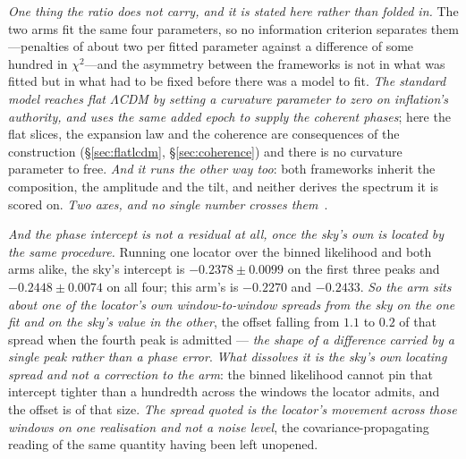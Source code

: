 \documentclass[11pt,a4paper]{article}
\theoremstyle{plain}
\theoremstyle{definition}
\theoremstyle{remark}
\begin{document}
\emph{One thing the ratio does not carry, and it is stated here rather than folded in.} The two arms fit the
same four parameters, so no information criterion separates them---penalties of about two per fitted parameter
against a difference of some hundred in $\chi^{2}$---and the asymmetry between the frameworks is not in what was
fitted but in what had to be fixed before there was a model to fit. \emph{The standard model reaches flat
$\Lambda$CDM by setting a curvature parameter to zero on inflation's authority, and uses the same added epoch
to supply the coherent phases}; here the flat slices, the expansion law and the coherence are consequences of
the construction (\S\ref{sec:flatlcdm}, \S\ref{sec:coherence}) and there is no curvature parameter to free.
\emph{And it runs the other way too}: both frameworks inherit the composition, the amplitude and the tilt, and
neither derives the spectrum it is scored on. \emph{Two axes, and no single number crosses
them}~\cite{JanzenSynthesis}.

\emph{And the phase intercept is not a residual at all, once the sky's own is located by the same
procedure.} Running one locator over the binned likelihood and both arms alike, the sky's intercept is
$-0.2378\pm0.0099$ on the first three peaks and $-0.2448\pm0.0074$ on all four; this arm's is $-0.2270$ and
$-0.2433$. \emph{So the arm sits about one of the locator's own window-to-window spreads from the sky on the one fit and on the sky's value in the other},
the offset falling from $1.1$ to $0.2$ of that spread when the fourth peak is admitted --- \emph{the shape of a difference carried by a single peak
rather than a phase
error}. \emph{What
dissolves it is the sky's own locating spread and not a correction to the arm}: the binned likelihood cannot
pin that intercept tighter than a hundredth across the windows the locator admits, and the offset is of
that size. \emph{The spread quoted is the locator's movement across those windows on one realisation and not a
noise level}, the covariance-propagating reading of the same quantity having been left unopened.
\end{document}
